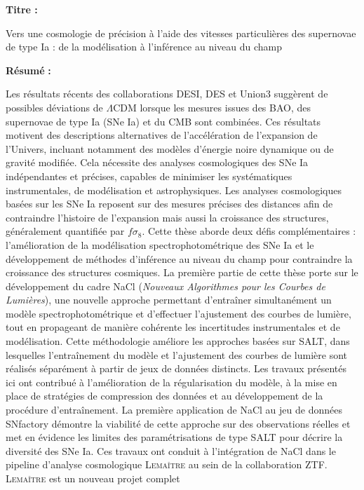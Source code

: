 \newpage
\thispagestyle{empty}
\parskip 7pt


{\bfseries Titre :}

Vers une cosmologie de précision à l’aide des vitesses particulières des supernovae de type Ia : de la modélisation à l’inférence au niveau du champ


{\bfseries Résumé}  {\bfseries :}

Les résultats récents des collaborations DESI, DES et Union3 suggèrent de possibles déviations de $\Lambda$CDM lorsque les mesures issues des BAO, des supernovae de 
type Ia (SNe Ia) et du CMB sont combinées. Ces résultats motivent des descriptions alternatives de l’accélération de l’expansion de l’Univers, incluant notamment 
des modèles d’énergie noire dynamique ou de gravité modifiée. Cela nécessite des analyses cosmologiques des SNe Ia indépendantes et précises, capables de minimiser 
les systématiques instrumentales, de modélisation et astrophysiques. Les analyses cosmologiques basées sur les SNe Ia reposent sur des mesures précises des distances 
afin de contraindre l’histoire de l’expansion mais aussi la croissance des structures, généralement quantifiée par $f\sigma_8$. Cette thèse aborde deux défis complémentaires : 
l’amélioration de la modélisation spectrophotométrique des SNe Ia et le développement de méthodes d’inférence au niveau du champ pour contraindre la croissance des structures 
cosmiques. La première partie de cette thèse porte sur le développement du cadre NaCl (\textit{Nouveaux Algorithmes pour les Courbes de Lumières}), une nouvelle approche permettant 
d’entraîner simultanément un modèle spectrophotométrique et d’effectuer l’ajustement des courbes de lumière, tout en propageant de manière cohérente les incertitudes 
instrumentales et de modélisation. Cette méthodologie améliore les approches basées sur SALT, dans lesquelles l’entraînement du modèle et l’ajustement des courbes de 
lumière sont réalisés séparément à partir de jeux de données distincts. Les travaux présentés ici ont contribué à l’amélioration de la régularisation du modèle, à la mise 
en place de stratégies de compression des données et au développement de la procédure d’entraînement. La première application de NaCl au jeu de données SNfactory démontre 
la viabilité de cette approche sur des observations réelles et met en évidence les limites des paramétrisations de type SALT pour décrire la diversité des SNe Ia. Ces 
travaux ont conduit à l’intégration de NaCl dans le pipeline d’analyse cosmologique \textsc{Lemaître} au sein de la collaboration ZTF. \textsc{Lemaître} est un nouveau projet complet 
